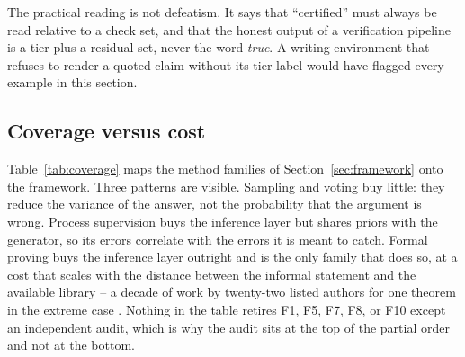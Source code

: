 \documentclass[11pt]{article}
\theoremstyle{plain}
\theoremstyle{definition}
\begin{document}
The practical reading is not defeatism. It says that ``certified'' must always be read relative
to a check set, and that the honest output of a verification pipeline is a tier plus a residual
set, never the word \emph{true}. A writing environment that refuses to render a quoted claim
without its tier label would have flagged every example in this section.

\subsection{Coverage versus cost}

Table~\ref{tab:coverage} maps the method families of Section~\ref{sec:framework} onto the
framework. Three patterns are visible. Sampling and voting buy little: they reduce the variance of
the answer, not the probability that the argument is wrong. Process supervision buys the inference
layer but shares priors with the generator, so its errors correlate with the errors it is meant to
catch. Formal proving buys the inference layer outright and is the only family that does so, at a
cost that scales with the distance between the informal statement and the available library -- a
decade of work by twenty-two listed authors for one theorem in the extreme case
\citep{hales2017kepler}. Nothing in the table retires F1, F5, F7, F8, or F10 except an independent
audit, which is why the audit sits at the top of the partial order and not at the bottom.
\end{document}
